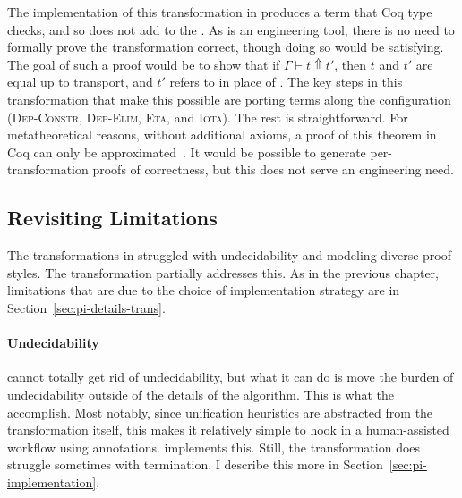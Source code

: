 The implementation of this transformation in \toolnamec produces a term that Coq type checks, and so does not
add to the .
As \toolnamec is an engineering tool, there is no need to formally prove the transformation correct, though doing so would be satisfying.
The goal of such a proof would be to show that %
if $\Gamma \vdash t \Uparrow t'$,
then $t$ and $t'$ are equal up to transport, and $t'$ refers to \B in place of \Aa.
The key steps in this transformation that make this possible are porting terms along the configuration %
(\textsc{Dep-Constr}, \textsc{Dep-Elim}, \textsc{Eta}, and \textsc{Iota}).
The rest is straightforward.
For metatheoretical reasons, without additional axioms, a proof of this theorem in Coq can only be approximated~\cite{tabareau2017equivalences}.
It would be possible to generate per-transformation proofs of correctness, but this does not serve an engineering need.

\subsection{Revisiting Limitations}
\label{sec:pi-trans-limitations}

The transformations in \sysname struggled with undecidability and modeling diverse proof styles.
The \toolnamec transformation partially addresses this.
As in the previous chapter, limitations that are due to the choice of implementation strategy are in Section~\ref{sec:pi-details-trans}.

\paragraph{Undecidability}
\toolnamec cannot totally get rid of undecidability, but what it can do is move
the burden of undecidability outside of the details of the algorithm.
This is what the  accomplish.
Most notably, since unification heuristics are abstracted from the transformation itself,
this makes it relatively simple to hook in a human-assisted workflow using annotations.
\toolnamec implements this.
Still, the \toolnamec transformation does struggle sometimes with termination.
I describe this more in Section~\ref{sec:pi-implementation}.

